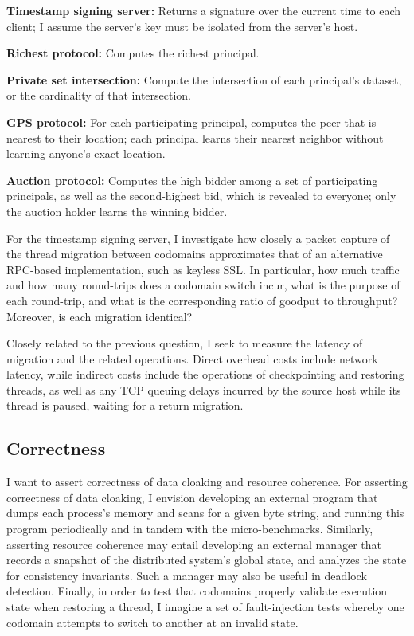 \begin{widelist}
\item \textbf{Timestamp signing server:} Returns a signature over the current
time to each client; I assume the server's key must be isolated from the
server's host.
%
\item \textbf{Richest protocol:} Computes the richest principal.
%
\item \textbf{Private set intersection:} Compute the intersection of each
    principal's dataset, or the cardinality of that intersection.
\item \textbf{GPS protocol:} For each participating principal,
computes the peer that is nearest to their location; each principal learns
their nearest neighbor without learning anyone's exact location.
%
\item \textbf{Auction protocol:} Computes the high bidder among a set of
participating principals, as well as the second-highest bid, which is revealed
to everyone; only the auction holder learns the winning bidder.
\end{widelist}

For the timestamp signing server, I investigate how closely a
packet capture of the thread migration between codomains approximates
that of an alternative RPC-based implementation, such as keyless SSL\@.
%
In particular, how much traffic and how many round-trips does a codomain switch
incur, what is the purpose of each round-trip, and what is the corresponding
ratio of goodput to throughput?
%
Moreover, is each migration identical?


Closely related to the previous question, I seek to measure the latency of
migration and the related operations.
%
Direct overhead costs include network latency, while indirect costs include the
operations of checkpointing and restoring threads, as well as any TCP queuing
delays incurred by the source host while its thread is paused, waiting for
a return migration.


\subsection{Correctness}

I want to assert correctness of data cloaking and resource coherence.
%
For asserting correctness of data cloaking, I envision developing an external
program that dumps each process's memory and scans for a given byte string,
and running this program periodically and in tandem with the micro-benchmarks.
%
Similarly, asserting resource coherence may entail developing an external
manager that records a snapshot of the distributed system's global state, and
analyzes the state for consistency invariants.
%
Such a manager may also be useful in deadlock detection.
%
Finally, in order to test that codomains properly validate execution state when
restoring a thread, I imagine a set of fault-injection tests whereby one
codomain attempts to switch to another at an invalid state.
